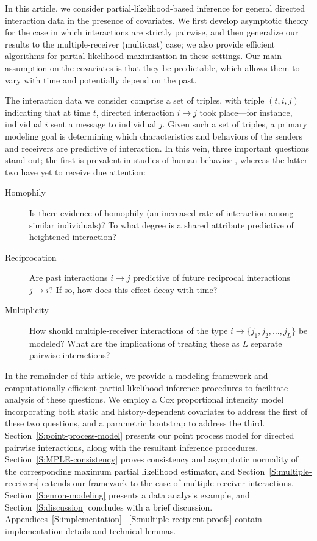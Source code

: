\documentclass[final]{statsoc}
\begin{document}
In this article, we consider partial-likelihood-based inference for general
directed interaction data in the presence of covariates.  We first develop
asymptotic theory for the case in which interactions are strictly pairwise,
and then generalize our results to the multiple-receiver (multicast) case;
we also provide efficient algorithms for partial likelihood maximization in
these settings.  Our main assumption on the covariates is that they be
predictable, which allows them to vary with time and potentially depend on
the past.

The interaction data we consider comprise a set of triples, with triple
$(t,i,j)$ indicating that at time $t$, directed interaction
$i\rightarrow j$ took place---for instance, individual $i$ sent a message
to individual $j$.  Given such a set of triples, a primary modeling goal is
determining which characteristics and behaviors of the senders and
receivers are predictive of interaction.  In this vein, three important
questions stand out; the first is prevalent in studies of human
behavior \citep{mcpherson2001birds}, whereas the latter two have
yet to receive due attention:

\begin{description}
    \item[Homophily] Is there evidence of homophily (an increased rate of
    interaction among similar individuals)?  To what degree is a shared
    attribute predictive of heightened interaction?

    \item[Reciprocation] Are past interactions $i \rightarrow j$ predictive
    of future reciprocal interactions $j \rightarrow i$? If so, how does this
    effect decay with time?

    \item[Multiplicity] How should multiple-receiver interactions of the
    type $i \rightarrow \{j_1,j_2,\ldots, j_L\}$ be modeled?  What are the
    implications of treating these as $L$ separate pairwise interactions?
\end{description}

In the remainder of this article, we provide a modeling framework and
computationally efficient partial likelihood inference procedures to
facilitate analysis of these questions.  We employ a Cox proportional
intensity model incorporating both static and history-dependent covariates
to address the first of these two questions, and a parametric bootstrap to
address the third. Section~\ref{S:point-process-model} presents our point
process model for directed pairwise interactions, along with the resultant
inference procedures. Section~\ref{S:MPLE-consistency} proves consistency
and asymptotic normality of the corresponding maximum partial likelihood
estimator, and Section~\ref{S:multiple-receivers} extends our framework to
the case of multiple-receiver interactions.  Section~\ref{S:enron-modeling}
presents a data analysis example, and Section~\ref{S:discussion} concludes
with a brief discussion.  Appendices~\ref{S:implementation}--%
\ref{S:multiple-recipient-proofs} contain implementation details and
technical lemmas.
\end{document}
